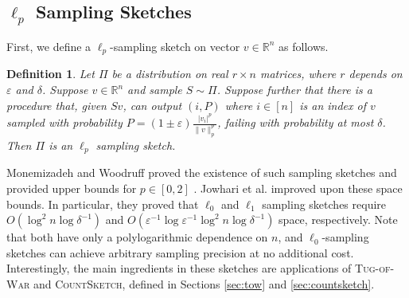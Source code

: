 \documentclass{report}
\newtheorem{definition}{Definition}[section]
\newcommand{\algoname}[1]{\textnormal{\textsc{#1}}}
\begin{document}
\subsection{$\ell_p$ Sampling Sketches} \label{sec:lp-sample}

First, we define a $\ell_p$-sampling sketch on vector $v \in \mathbb{R}^n$ as follows.
%
\begin{definition}
Let $\Pi$ be a distribution on real $r \times n$ matrices, where $r$ depends on $\varepsilon$ and $\delta$. 
Suppose $v \in \mathbb{R}^n$ and sample $S \sim \Pi$. 
Suppose further that there is a procedure that, given $Sv$, can output $(i,P)$ where $i \in [n]$ is an index of $v$ sampled with probability $P = (1 \pm \varepsilon)\frac{|v_i|^p}{\|v\|^p_p}$, failing with probability at most $\delta$. 
Then $\Pi$ is an $\ell_p$ sampling sketch.
\end{definition}
%

Monemizadeh and Woodruff proved the existence of such sampling sketches and provided upper bounds for $p \in [0,2]$ \cite{monemizadeh20101}.
Jowhari et al. \cite{jowhari2011tight} improved upon these space bounds.
In particular, they proved that $\ell_0$ and $\ell_1$ sampling sketches require $O(\log^2 n \log \delta^{-1})$ and $O(\varepsilon^{-1} \log \varepsilon^{-1} \log^2 n \log \delta^{-1})$ space, respectively.
Note that both have only a polylogarithmic dependence on $n$, and $\ell_0$-sampling sketches can achieve arbitrary sampling precision at no additional cost. 
Interestingly, the main ingredients in these sketches are applications of \algoname{Tug-of-War} and \algoname{CountSketch}, defined in Sections \ref{sec:tow} and \ref{sec:countsketch}. 
\end{document}
